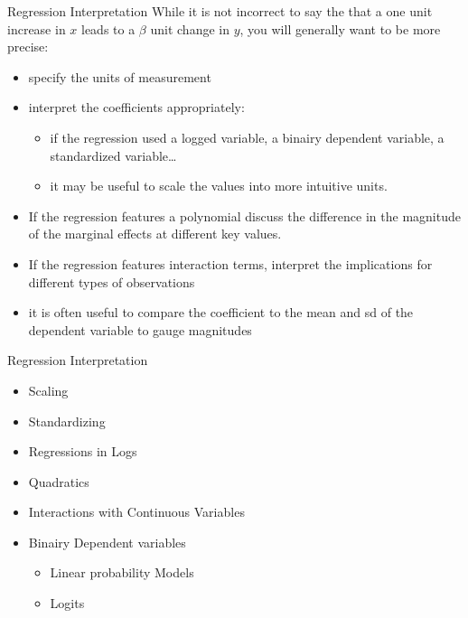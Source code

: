 \documentclass[
  ignorenonframetext,
]{beamer}
\begin{document}
\begin{frame}{Regression Interpretation}
\protect\hypertarget{regression-interpretation-1}{}
While it is not incorrect to say the that a one unit increase in \(x\)
leads to a \(\beta\) unit change in \(y\), you will generally want to be
more precise:

\begin{itemize}
\item
  specify the units of measurement
\item
  interpret the coefficients appropriately:

  \begin{itemize}
  \item
    if the regression used a logged variable, a binairy dependent
    variable, a standardized variable\ldots{}
  \item
    it may be useful to scale the values into more intuitive units.
  \end{itemize}
\item
  If the regression features a polynomial discuss the difference in the
  magnitude of the marginal effects at different key values.
\item
  If the regression features interaction terms, interpret the
  implications for different types of observations
\item
  it is often useful to compare the coefficient to the mean and sd of
  the dependent variable to gauge magnitudes
\end{itemize}
\end{frame}

\begin{frame}{Regression Interpretation}
\protect\hypertarget{regression-interpretation-2}{}
\begin{itemize}
\item
  Scaling
\item
  Standardizing
\item
  Regressions in Logs
\item
  Quadratics
\item
  Interactions with Continuous Variables
\item
  Binairy Dependent variables

  \begin{itemize}
  \item
    Linear probability Models
  \item
    Logits
  \end{itemize}
\end{itemize}
\end{frame}
\end{document}
